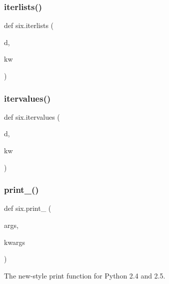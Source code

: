 \mbox{\label{namespacesix_ac8538bbb01331110a586f0ace3ee9b74}} 
\subsubsection{\texorpdfstring{iterlists()}{iterlists()}}
{\footnotesize\ttfamily def six.\+iterlists (\begin{DoxyParamCaption}\item[{}]{d,  }\item[{}]{kw }\end{DoxyParamCaption})}

\mbox{\label{namespacesix_a34ce02289f1999494da2b3274b465796}} 
\subsubsection{\texorpdfstring{itervalues()}{itervalues()}}
{\footnotesize\ttfamily def six.\+itervalues (\begin{DoxyParamCaption}\item[{}]{d,  }\item[{}]{kw }\end{DoxyParamCaption})}

\mbox{\label{namespacesix_ad04fa7d5b6867bc3d14c6cac60116ced}} 
\subsubsection{\texorpdfstring{print\+\_\+()}{print\_()}}
{\footnotesize\ttfamily def six.\+print\+\_\+ (\begin{DoxyParamCaption}\item[{}]{args,  }\item[{}]{kwargs }\end{DoxyParamCaption})}

\begin{DoxyVerb}The new-style print function for Python 2.4 and 2.5.\end{DoxyVerb}
 \mbox{\label{namespacesix_a341d28e4b5838a614702f1b01b9ce39d}} 
